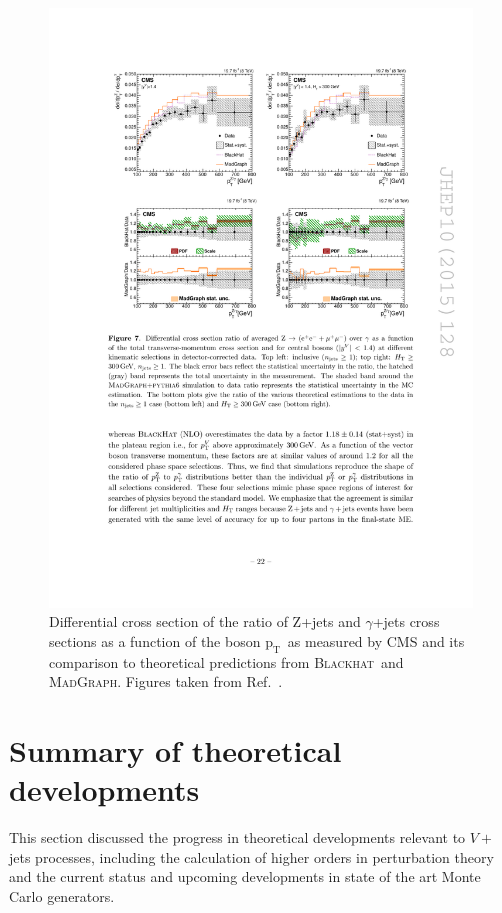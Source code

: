 \documentclass[a4paper,11pt,notoc]{article}
\newcommand{\pt}{\ensuremath{\mathrm{p_T}}}
\newcommand{\BLACKHAT}{\textsc{Blackhat}}
\newcommand{\MADGRAPH}{\textsc{MadGraph}}
\begin{document}
\begin{figure}[t!]
\centering
\includegraphics[width=0.9\columnwidth]{ZgammaratioCMS.pdf} 
\caption{Differential cross section of the ratio of Z+jets and $\gamma$+jets cross sections as a function of the boson \pt\ as measured by CMS and its comparison to theoretical predictions from \BLACKHAT\ and \MADGRAPH. Figures taken from Ref.~\cite{Khachatryan:2015ira}.}
\label{fig:ptNNLO}
\end{figure}   


\section{Summary of theoretical developments}
This section discussed the progress in theoretical developments relevant to
$V+$jets processes, including the calculation of higher orders in perturbation
theory and the current status and upcoming developments in state of the art
Monte Carlo generators. 
\end{document}

